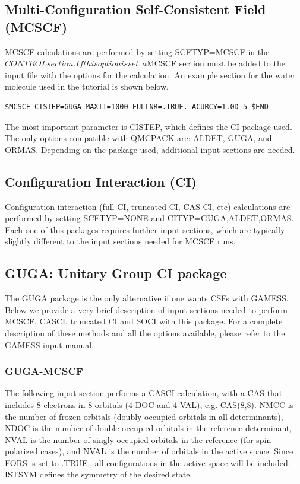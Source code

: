\subsection{Multi-Configuration Self-Consistent Field (MCSCF)}
MCSCF calculations are performed by setting SCFTYP=MCSCF in the $CONTROL
section. If this option is set, a $MCSCF section must be added to the input file with the
options for the calculation. An example section for the water molecule used in the tutorial
is shown below.

\begin{lstlisting}
$MCSCF CISTEP=GUGA MAXIT=1000 FULLNR=.TRUE. ACURCY=1.0D-5 $END
\end{lstlisting}

The most important parameter is CISTEP, which defines the CI package used. The only
options compatible with QMCPACK are: ALDET, GUGA, and ORMAS. Depending on the
package used, additional input sections are needed.


\subsection{Configuration Interaction (CI)}
Configuration interaction (full CI, truncated CI, CAS-CI, etc) calculations are performed
by setting SCFTYP=NONE and CITYP=GUGA,ALDET,ORMAS. Each one of this packages 
requires further input sections, which are typically slightly different to the input sections
needed for MCSCF runs.


\subsection{GUGA: Unitary Group CI package}
The GUGA package is the only alternative if one wants CSFs with GAMESS. Below
we provide a very brief description of input sections needed to perform MCSCF, CASCI,
truncated CI and SOCI with this package. For a complete description of these methods and
all the options available, please refer to the GAMESS input manual.

\subsubsection{GUGA-MCSCF}
The following input section performs a CASCI calculation, with a CAS that includes 8
electrons in 8 orbitals (4 DOC and 4 VAL), e.g. CAS(8,8). NMCC is the number of frozen
orbitals (doubly occupied orbitals in all determinants), NDOC is the number of double
occupied orbitals in the reference determinant, NVAL is the number of singly occupied
orbitals in the reference (for spin polarized cases), and NVAL is the number of orbitals in
the active space. Since FORS is set to .TRUE., all configurations in the active space will
be included. ISTSYM defines the symmetry of the desired state.

